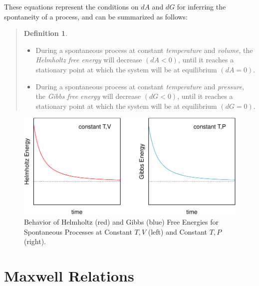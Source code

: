\documentclass[
  9pt,
]{extbook}
\providecommand{\tightlist}{%
  \setlength{\itemsep}{0pt}\setlength{\parskip}{0pt}}
\theoremstyle{definition}
\newtheorem{definition}{Definition}[chapter]
\theoremstyle{definition}
\theoremstyle{definition}
\theoremstyle{remark}
\begin{document}
These equations represent the conditions on \(dA\) and \(dG\) for inferring the spontaneity of a process, and can be summarized as follows:

\begin{quote}
\begin{definition}
\protect\hypertarget{def:helmgibbsminimum}{}{\label{def:helmgibbsminimum} }\(\;\)

\begin{itemize}
\tightlist
\item
  During a spontaneous process at constant \emph{temperature} and \emph{volume}, the \emph{Helmholtz free energy} will decrease \((dA<0)\), until it reaches a stationary point at which the system will be at equilibrium \((dA=0)\).
\item
  During a spontaneous process at constant \emph{temperature} and \emph{pressure}, the \emph{Gibbs free energy} will decrease \((dG<0)\), until it reaches a stationary point at which the system will be at equilibrium \((dG=0)\).
\end{itemize}
\end{definition}
\end{quote}

\begin{figure}

{\centering \includegraphics{pchem1_files/figure-latex/agfig-1} 

}

\caption{Behavior of Helmholtz (red) and Gibbs (blue) Free Energies for Spontaneous Processes at Constant $T,V$ (left) and Constant $T,P$ (right).}\label{fig:agfig}
\end{figure}

\hypertarget{maxwell}{%
\section{Maxwell Relations}\label{maxwell}}
\end{document}
